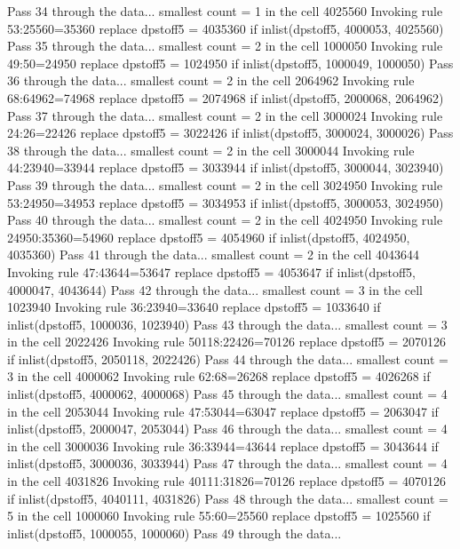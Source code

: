Pass 34 through the data...
  smallest count = 1 in the cell      4025560
  Invoking rule 53:25560=35360
  replace dpstoff5 = 4035360 if inlist(dpstoff5, 4000053, 4025560)
Pass 35 through the data...
  smallest count = 2 in the cell      1000050
  Invoking rule 49:50=24950
  replace dpstoff5 = 1024950 if inlist(dpstoff5, 1000049, 1000050)
Pass 36 through the data...
  smallest count = 2 in the cell      2064962
  Invoking rule 68:64962=74968
  replace dpstoff5 = 2074968 if inlist(dpstoff5, 2000068, 2064962)
Pass 37 through the data...
  smallest count = 2 in the cell      3000024
  Invoking rule 24:26=22426
  replace dpstoff5 = 3022426 if inlist(dpstoff5, 3000024, 3000026)
Pass 38 through the data...
  smallest count = 2 in the cell      3000044
  Invoking rule 44:23940=33944
  replace dpstoff5 = 3033944 if inlist(dpstoff5, 3000044, 3023940)
Pass 39 through the data...
  smallest count = 2 in the cell      3024950
  Invoking rule 53:24950=34953
  replace dpstoff5 = 3034953 if inlist(dpstoff5, 3000053, 3024950)
Pass 40 through the data...
  smallest count = 2 in the cell      4024950
  Invoking rule 24950:35360=54960
  replace dpstoff5 = 4054960 if inlist(dpstoff5, 4024950, 4035360)
Pass 41 through the data...
  smallest count = 2 in the cell      4043644
  Invoking rule 47:43644=53647
  replace dpstoff5 = 4053647 if inlist(dpstoff5, 4000047, 4043644)
Pass 42 through the data...
  smallest count = 3 in the cell      1023940
  Invoking rule 36:23940=33640
  replace dpstoff5 = 1033640 if inlist(dpstoff5, 1000036, 1023940)
Pass 43 through the data...
  smallest count = 3 in the cell      2022426
  Invoking rule 50118:22426=70126
  replace dpstoff5 = 2070126 if inlist(dpstoff5, 2050118, 2022426)
Pass 44 through the data...
  smallest count = 3 in the cell      4000062
  Invoking rule 62:68=26268
  replace dpstoff5 = 4026268 if inlist(dpstoff5, 4000062, 4000068)
Pass 45 through the data...
  smallest count = 4 in the cell      2053044
  Invoking rule 47:53044=63047
  replace dpstoff5 = 2063047 if inlist(dpstoff5, 2000047, 2053044)
Pass 46 through the data...
  smallest count = 4 in the cell      3000036
  Invoking rule 36:33944=43644
  replace dpstoff5 = 3043644 if inlist(dpstoff5, 3000036, 3033944)
Pass 47 through the data...
  smallest count = 4 in the cell      4031826
  Invoking rule 40111:31826=70126
  replace dpstoff5 = 4070126 if inlist(dpstoff5, 4040111, 4031826)
Pass 48 through the data...
  smallest count = 5 in the cell      1000060
  Invoking rule 55:60=25560
  replace dpstoff5 = 1025560 if inlist(dpstoff5, 1000055, 1000060)
Pass 49 through the data...
